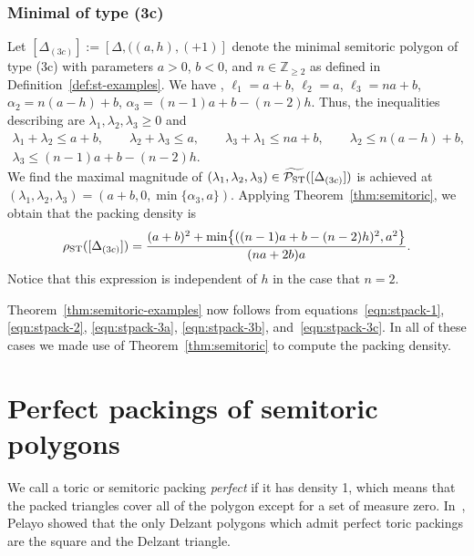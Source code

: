 \documentclass[10pt,a4paper]{amsart}
\numberwithin{equation}{section}
\def\Z{{\mathbb Z}}
\newcommand{\De}{\Delta}
\newcommand{\PSTtilde}{\widetilde{\mathcal{P}_{\rm ST}}}
\theoremstyle{definition}
\theoremstyle{plain}
\theoremstyle{plain}
\begin{document}
\subsubsection{Minimal of type (3c)}
Let $[\De_{(3c)}]:=[\De,((a,h),(+1)]$ denote the minimal semitoric polygon of type (3c) with parameters $a>0$, $b<0$, and $n\in\Z_{\geq 2}$ as defined in Definition~\ref{def:st-examples}. We have \smash{$\textrm{area}(\De) = \frac{(na+2b)a}{2}$}, $\ell_1 = a+b$, $\ell_2 = a$, $\ell_3 = na+b$, $\alpha_2 = n(a-h)+b$, $\alpha_3 = (n-1)a+b - (n-2)h$. Thus, the inequalities describing \smash{$\PSTtilde([\De_{(3c)}])$} are $\lambda_1,\lambda_2,\lambda_3\geq 0$ and
\begin{gather*}
 \lambda_1+\lambda_2 \leq a+b,\qquad
 \lambda_2+\lambda_3 \leq a,\qquad
 \lambda_3+\lambda_1 \leq na+b,\qquad
 \lambda_2 \leq n(a-h)+b,\\
 \lambda_3 \leq (n-1)a+b - (n-2)h.
\end{gather*}
We find the maximal magnitude of $(\lambda_1,\lambda_2,\lambda_3)\in\PSTtilde([\De_{(3c)}])$ is achieved at $(\lambda_1,\lambda_2,\lambda_3) = (a+b,0,\min\{\alpha_3,a\})$. Applying Theorem~\ref{thm:semitoric}, we obtain that the packing density is
\begin{equation}\label{eqn:stpack-3c}
\rho_{{\rm ST}} ([\De_{(3c)}]) = \frac{(a+b)^2+\min\bigl\{ ((n-1)a+b - (n-2)h )^2,a^2\bigr\}}{(na+2b)a}.
\end{equation}
Notice that this expression is independent of $h$ in the case that $n=2$.



Theorem~\ref{thm:semitoric-examples} now
follows from equations~\eqref{eqn:stpack-1}, \eqref{eqn:stpack-2}, \eqref{eqn:stpack-3a}, \eqref{eqn:stpack-3b}, and~\eqref{eqn:stpack-3c}.
In all of these cases we made use of Theorem~\ref{thm:semitoric} to compute the packing density.






\section{Perfect packings of semitoric polygons}
\label{sec:perfect}

We call a toric or semitoric packing \emph{perfect} if it has density 1, which means that the packed triangles cover all of the polygon except for a set of measure zero.
In~\cite{Pe2006}, Pelayo showed that the only Delzant polygons which admit perfect toric packings are the square and the Delzant triangle.
\end{document}
